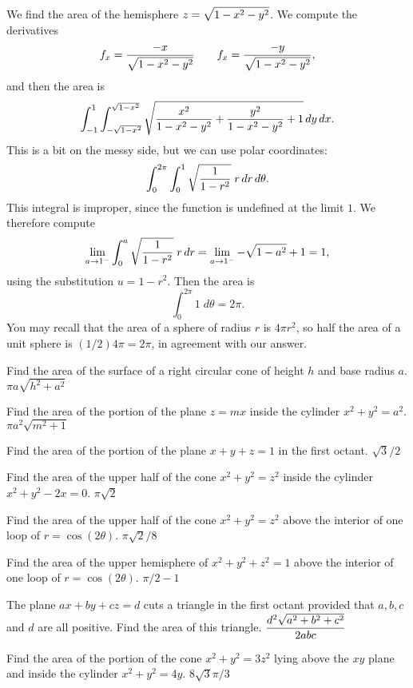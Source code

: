 \example We find the area of the hemisphere $\displaystyle z=\sqrt{1-x^2-y^2}$. We
compute the derivatives
$$f_x={-x\over\sqrt{1-x^2-y^2}} \qquad
f_x={-y\over\sqrt{1-x^2-y^2}},$$
and then the area is
$$\int_{-1}^{1}\int_{-\sqrt{1-x^2}}^{\sqrt{1-x^2}}
\sqrt{ {x^2\over1-x^2-y^2}+{y^2\over1-x^2-y^2}+1}\,dy\,dx.$$
This is a bit on the messy side, but we can use polar coordinates:
$$
\int_{0}^{2\pi}\int_{0}^{1}
\sqrt{ {1\over1-r^2}}\;r\,dr\,d\theta.$$
This integral is improper, since the function is undefined at the
limit $1$. We therefore compute
$$\lim_{a\to1^-}\int_{0}^{a}
\sqrt{ {1\over1-r^2}}\;r\,dr=\lim_{a\to1^-}-\sqrt{1-a^2}+1=1,$$
using the substitution $u=1-r^2$. Then the area is 
$$\int_{0}^{2\pi}1\;d\theta=2\pi.$$
You may
recall that the area of a sphere of radius $r$ is $4\pi r^2$, so half
the area of a unit sphere is $(1/2)4\pi=2\pi$, in agreement with our
answer. 
\endexample

\exercises

\exercise Find the area of the surface of a right circular cone of
height $h$ and base radius $a$.
\answer $\pi a\sqrt{h^2+a^2}$
\endanswer
\endexercise

\exercise Find the area of the portion of the plane $z=mx$ inside the
cylinder $x^2+y^2=a^2$.
\answer $\pi a^2\sqrt{m^2+1}$
\endanswer
\endexercise

\exercise Find the area of the portion of the plane $x+y+z=1$ in the
first octant.
\answer $\sqrt3/2$
\endanswer
\endexercise

\exercise Find the area of the upper half of the cone
$x^2+y^2=z^2$ inside the cylinder $x^2+y^2-2x = 0$.
\answer $\pi\sqrt2$
\endanswer
\endexercise

\exercise Find the area of the upper half of the cone
$x^2+y^2=z^2$ above the interior of one loop of $r=\cos(2\theta)$.
\answer $\pi\sqrt2/8$
\endanswer
\endexercise

\exercise Find the area of the upper hemisphere of 
$x^2+y^2+z^2=1$ above the interior of one loop of $r=\cos(2\theta)$.
\answer $\pi/2-1$
\endanswer
\endexercise

\exercise The plane $ax+by+cz=d$ cuts a triangle in the first octant
provided that $a, b, c$ and $d$ are all positive.  Find the area of
this triangle.
\answer $\displaystyle {d^2\sqrt{a^2+b^2+c^2}\over 2abc}$
\endanswer

\endexercise

\exercise Find the area of the portion of the cone $x^2+y^2 = 3z^2$ lying
above the $xy$ plane and inside the cylinder $x^2+y^2 = 4y$.
\answer $8\sqrt{3}\pi/3$
\endanswer
\endexercise

\endexercises

